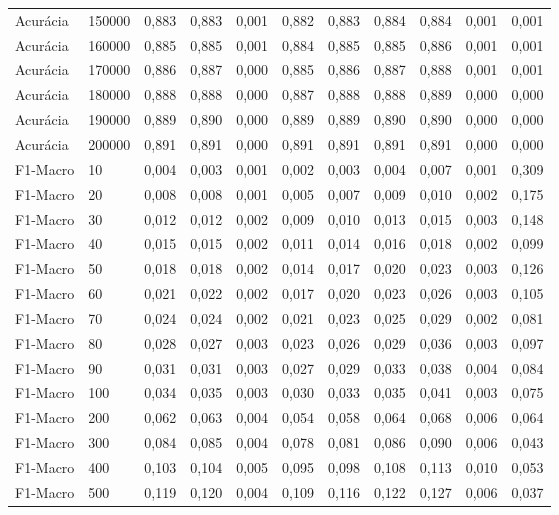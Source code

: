 \begin{longtable}{@{}llrrrrrrrrr@{}}
Acurácia & 150000 & 0,883 & 0,883 & 0,001 & 0,882 & 0,883 & 0,884 & 0,884 & 0,001 & 0,001 \\
Acurácia & 160000 & 0,885 & 0,885 & 0,001 & 0,884 & 0,885 & 0,885 & 0,886 & 0,001 & 0,001 \\
Acurácia & 170000 & 0,886 & 0,887 & 0,000 & 0,885 & 0,886 & 0,887 & 0,888 & 0,001 & 0,001 \\
Acurácia & 180000 & 0,888 & 0,888 & 0,000 & 0,887 & 0,888 & 0,888 & 0,889 & 0,000 & 0,000 \\
Acurácia & 190000 & 0,889 & 0,890 & 0,000 & 0,889 & 0,889 & 0,890 & 0,890 & 0,000 & 0,000 \\
Acurácia & 200000 & 0,891 & 0,891 & 0,000 & 0,891 & 0,891 & 0,891 & 0,891 & 0,000 & 0,000 \\
F1-Macro & 10 & 0,004 & 0,003 & 0,001 & 0,002 & 0,003 & 0,004 & 0,007 & 0,001 & 0,309 \\
F1-Macro & 20 & 0,008 & 0,008 & 0,001 & 0,005 & 0,007 & 0,009 & 0,010 & 0,002 & 0,175 \\
F1-Macro & 30 & 0,012 & 0,012 & 0,002 & 0,009 & 0,010 & 0,013 & 0,015 & 0,003 & 0,148 \\
F1-Macro & 40 & 0,015 & 0,015 & 0,002 & 0,011 & 0,014 & 0,016 & 0,018 & 0,002 & 0,099 \\
F1-Macro & 50 & 0,018 & 0,018 & 0,002 & 0,014 & 0,017 & 0,020 & 0,023 & 0,003 & 0,126 \\
F1-Macro & 60 & 0,021 & 0,022 & 0,002 & 0,017 & 0,020 & 0,023 & 0,026 & 0,003 & 0,105 \\
F1-Macro & 70 & 0,024 & 0,024 & 0,002 & 0,021 & 0,023 & 0,025 & 0,029 & 0,002 & 0,081 \\
F1-Macro & 80 & 0,028 & 0,027 & 0,003 & 0,023 & 0,026 & 0,029 & 0,036 & 0,003 & 0,097 \\
F1-Macro & 90 & 0,031 & 0,031 & 0,003 & 0,027 & 0,029 & 0,033 & 0,038 & 0,004 & 0,084 \\
F1-Macro & 100 & 0,034 & 0,035 & 0,003 & 0,030 & 0,033 & 0,035 & 0,041 & 0,003 & 0,075 \\
F1-Macro & 200 & 0,062 & 0,063 & 0,004 & 0,054 & 0,058 & 0,064 & 0,068 & 0,006 & 0,064 \\
F1-Macro & 300 & 0,084 & 0,085 & 0,004 & 0,078 & 0,081 & 0,086 & 0,090 & 0,006 & 0,043 \\
F1-Macro & 400 & 0,103 & 0,104 & 0,005 & 0,095 & 0,098 & 0,108 & 0,113 & 0,010 & 0,053 \\
F1-Macro & 500 & 0,119 & 0,120 & 0,004 & 0,109 & 0,116 & 0,122 & 0,127 & 0,006 & 0,037 \\

\end{longtable}

